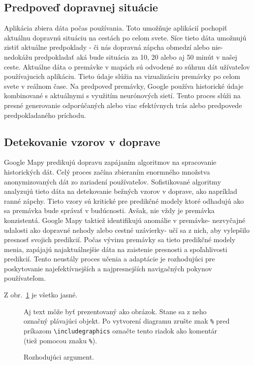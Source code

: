 \documentclass[10pt,twoside,slovak,a4paper]{article}
\begin{document}
\subsection{Predpoveď dopravnej situácie}
Aplikácia zbiera dáta počas používania. Toto umožňuje aplikácií pochopiť aktuálnu dopravnú situáciu na cestách po celom svete. Síce tieto dáta umožnujú zistiť aktuálne predpoklady - či nás dopravná zápcha obmedzí alebo nie- nedokážu predpokladať aká bude situácia za 10, 20 alebo aj 50 minút v našej ceste. 
Aktuálne dáta o premávke v mapách sú odvodené zo súhrnu dát užívateľov používajucich aplikáciu. Tieto údaje slúžia na vizualizáciu premávky po celom svete v reálnom čase. Na predpoveď premávky, Google používa historické údaje kombinované s aktuálnymi s využitím neurónových sietí. Tento proces slúži na presné generovanie odporúčaných alebo viac efektívnych trás alebo predpovede predpokladaného príchodu.
\subsection{Detekovanie vzorov v doprave}
Google Mapy predikujú dopravu zapájaním algoritmov na spracovanie historických dát. Celý proces začína zbieraním enormného množstva anonymizovaných dát zo zariadení používateľov. Sofistikované algoritmy analyzujú tieto dáta na detekovanie bežných vzorov v doprave, ako napríklad ranné zápchy. Tieto vzory sú kritické pre predikčné modely ktoré odhadujú ako sa premávka bude správať v budúcnosti.
Avšak, nie vždy je premávka konzistentá. Google Mapy taktiež identifikujú anomálie v premávke- nezvyčajné udalosti ako dopravné nehody alebo cestné uzávierky- učí sa z nich, aby vylepšilo presnosť svojich predikcií. Počas vývinu premávky sa tieto predikčné modely menia, zapájajú najaktuálnejšie dáta na zaistenie presnosti a spoľahlivosti predikcií. Tento neustály proces učenia a adaptácie je rozhodujúci pre poskytovanie najefektívnejších a najpresnejších navigačných pokynov používateľom.



Z obr.~\ref{f:rozhod} je všetko jasné. 

\begin{figure}[tbh]
\centering
Aj text môže byť prezentovaný ako obrázok. Stane sa z neho označný plávajúci objekt. Po vytvorení diagramu zrušte znak \texttt{\%} pred príkazom \verb|\includegraphics| označte tento riadok ako komentár (tiež pomocou znaku \texttt{\%}).
\caption{Rozhodujúci argument.}
\label{f:rozhod}
\end{figure}
\end{document}
